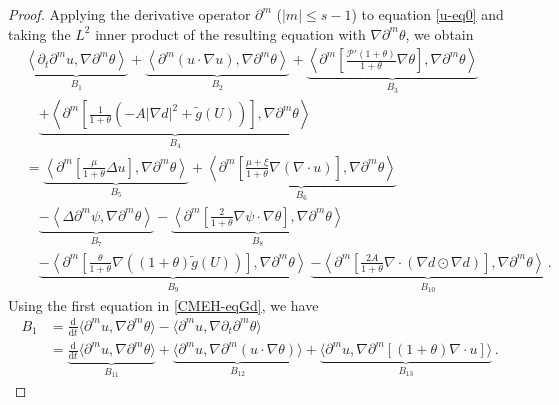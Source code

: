 \documentclass[reqno,11pt]{amsart}
\numberwithin{equation}{section}
\def\p{\partial}
\def\d{\mathrm{d}}
\begin{document}
\begin{proof}

Applying the derivative operator $\partial^m$ ($|m|\le s-1$) to equation \eqref{u-eq0} and taking the $L^2$ inner product of the resulting equation with $\nabla\partial^m\theta$, we obtain
\begin{equation}\label{theta-eq1} 
\begin{aligned}
&\underset{B_1}{\underbrace{\left\langle \partial_t \partial^m u, \nabla \partial^m \theta \right\rangle}}
+ \underset{B_2}{\underbrace{\left\langle \partial^m (u \cdot \nabla u), \nabla \partial^m \theta \right\rangle}}
+\underset{B_3}{\underbrace{ \left\langle \partial^m \left[ \frac{\mathcal{P}'(1+\theta)}{1+\theta} \nabla \theta \right], \nabla \partial^m \theta \right\rangle}}\\&
\quad\underset{B_4}{\underbrace{+ \left\langle \partial^m \left[ \frac{1}{1+\theta} \left( -A|\nabla d|^2 + \tilde{g}(U) \right) \right], \nabla \partial^m \theta \right\rangle}}\\&
= \underset{B_5}{\underbrace{\left\langle \partial^m \left[ \frac{\mu}{1+\theta} \Delta u \right], \nabla \partial^m \theta \right\rangle }}+ \underset{B_6}{\underbrace{\left\langle \partial^m \left[ \frac{\mu+\xi}{1+\theta} \nabla (\nabla \cdot u) \right], \nabla \partial^m \theta \right\rangle}}\\&
\quad\underset{B_7}{\underbrace{- \left\langle \Delta \partial^m \psi, \nabla \partial^m \theta \right\rangle}} - \underset{B_8}{\underbrace{\left\langle \partial^m \left[ \frac{2}{1+\theta} \nabla \psi \cdot \nabla \theta \right], \nabla \partial^m \theta \right\rangle}}\\&
\quad\underset{B_9}{\underbrace{- \left\langle \partial^m \left[ \frac{\theta}{1+\theta} \nabla \left( (1+\theta) \tilde{g}(U) \right) \right], \nabla \partial^m \theta \right\rangle}} \ \underset{B_{10}}{\underbrace{- \left\langle \partial^m \left[ \frac{2A}{1+\theta} \nabla \cdot (\nabla d \odot \nabla d) \right], \nabla \partial^m \theta \right\rangle}} \,.
\end{aligned}
\end{equation}
Using the first equation in \eqref{CMEH-eqGd}, we have
\begin{align*}
B_1 & = \frac{\d}{\d t} \langle \partial^m u, \nabla \partial^m \theta \rangle - \langle \partial^{m} u, \nabla \p_t\partial^m \theta \rangle \\
& = \underset{B_{11}}{ \underbrace{ \frac{\d}{\d t} \langle \partial^m u, \nabla \partial^m \theta \rangle } } + \underset{ B_{12} }{ \underbrace{ \langle \partial^m u, \nabla \partial^m (u \cdot \nabla \theta) \rangle } } + \underset{ B_{13} }{ \underbrace{ \langle \partial^m u, \nabla \partial^m [ ( 1 + \theta ) \nabla \cdot u ] \rangle } } \,.

\end{align*}
\end{proof}
\end{document}
